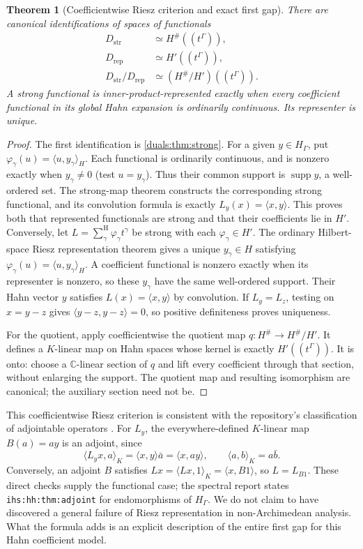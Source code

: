 \documentclass[11pt,letterpaper]{article}
\numberwithin{equation}{section}
\newtheorem{theorem}{Theorem}[section]
\theoremstyle{definition}
\theoremstyle{remark}
\newcommand{\C}{\mathbb C}
\newcommand{\HG}{H_\Gamma}
\newcommand{\supp}{\operatorname{supp}}
\newcommand{\Dstr}{D_{\mathrm{str}}}
\newcommand{\Drep}{D_{\mathrm{rep}}}
\newcommand{\sH}{\mathop{\sum}\nolimits^{\mathrm H}}
\newcommand{\ip}[2]{\langle#1,#2\rangle}
\newcommand{\ihs}[1]{\texttt{ihs:#1}}
\begin{document}
\begin{theorem}[Coefficientwise Riesz criterion and exact first gap]
\label{duals:thm:riesz}
There are canonical identifications of spaces of functionals
\begin{align}
 \Dstr&\simeq H^\#((t^\Gamma)),\label{duals:eq:hilbert-strong}\\
 \Drep&\simeq H'((t^\Gamma)),\label{duals:eq:hilbert-rep}\\
 \Dstr/\Drep&\simeq (H^\#/H')((t^\Gamma)).\label{duals:eq:riesz-quotient}
\end{align}
A strong functional is inner-product-represented exactly when every
coefficient functional in its global Hahn expansion is ordinarily
continuous. Its representer is unique.
\end{theorem}
\begin{proof}
The first identification is \cref{duals:thm:strong}. For a given
$y\in\HG$, put $\varphi_\gamma(u)=\ip{u}{y_\gamma}_H$.
Each functional is ordinarily continuous, and is nonzero exactly when
$y_\gamma\ne0$ (test $u=y_\gamma$). Thus their common support is
$\supp y$, a well-ordered set. The strong-map theorem constructs the
corresponding strong functional, and its convolution formula is exactly
$L_y(x)=\ip{x}{y}$. This proves both that represented functionals
are strong and that their coefficients lie in $H'$. Conversely, let
$L=\sH_\gamma\varphi_\gamma t^\gamma$ be strong with each
$\varphi_\gamma\in H'$. The ordinary Hilbert-space Riesz
representation theorem gives a unique $y_\gamma\in H$ satisfying
$\varphi_\gamma(u)=\ip{u}{y_\gamma}_H$.
A coefficient functional is nonzero exactly when its representer is
nonzero, so these $y_\gamma$ have the same well-ordered support.
Their Hahn vector $y$ satisfies $L(x)=\ip{x}{y}$ by convolution.
If $L_y=L_z$, testing on $x=y-z$ gives
$\ip{y-z}{y-z}=0$, so positive definiteness proves uniqueness.

For the quotient, apply coefficientwise the quotient map
$q:H^\#\to H^\#/H'$. It defines a $K$-linear map on Hahn spaces
whose kernel is exactly $H'((t^\Gamma))$. It is onto: choose a
$\C$-linear section of $q$ and lift every coefficient through that
section, without enlarging the support. The quotient map and resulting
isomorphism are canonical; the auxiliary section need not be.
\end{proof}

This coefficientwise Riesz criterion is consistent with the repository's
classification of adjointable operators \cite{RepoSpectral}. For $L_y$,
the everywhere-defined $K$-linear map $B(a)=ay$ is an adjoint, since
\[
 \ip{L_yx}{a}_K=\ip{x}{y}\bar a=\ip{x}{ay},
 \qquad \ip{a}{b}_K=a\bar b.
\]
Conversely, an adjoint $B$ satisfies
$Lx=\ip{Lx}{1}_K=\ip{x}{B1}$, so $L=L_{B1}$.
These direct checks supply the functional case; the spectral report
states \ihs{hh:thm:adjoint} for endomorphisms of $\HG$.
We do not claim to have
discovered a general failure of Riesz representation in non-Archimedean
analysis. What the formula adds is an explicit description of the entire
first gap for this Hahn coefficient model.
\end{document}
